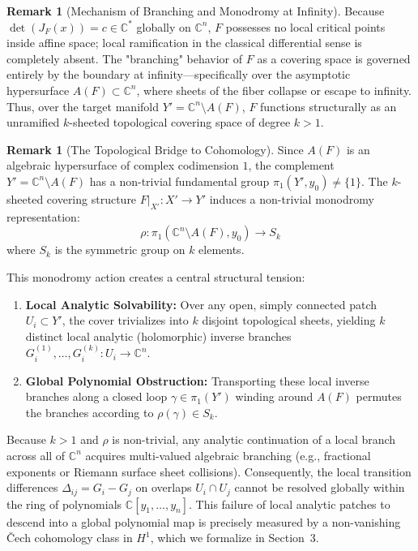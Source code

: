 \documentclass[11pt,reqno]{amsart}
\theoremstyle{definition}
\newtheorem{remark}[theorem]{Remark}
\begin{document}
\begin{remark}[Mechanism of Branching and Monodromy at Infinity]
Because $\det(J_F(x)) = c \in \mathbb{C}^*$ globally on $\mathbb{C}^n$, $F$ possesses no local critical points inside affine space; local ramification in the classical differential sense is completely absent. The "branching" behavior of $F$ as a covering space is governed entirely by the boundary at infinity—specifically over the asymptotic hypersurface $A(F) \subset \mathbb{C}^n$, where sheets of the fiber collapse or escape to infinity. Thus, over the target manifold $Y' = \mathbb{C}^n \setminus A(F)$, $F$ functions structurally as an unramified $k$-sheeted topological covering space of degree $k > 1$.
\end{remark}

\begin{remark}[The Topological Bridge to Cohomology]
Since $A(F)$ is an algebraic hypersurface of complex codimension $1$, the complement $Y' = \mathbb{C}^n \setminus A(F)$ has a non-trivial fundamental group $\pi_1(Y', y_0) \neq \{1\}$. The $k$-sheeted covering structure $F\big|_{X'}: X' \to Y'$ induces a non-trivial monodromy representation:
$$\rho: \pi_1(\mathbb{C}^n \setminus A(F), y_0) \longrightarrow S_k$$
where $S_k$ is the symmetric group on $k$ elements. 

This monodromy action creates a central structural tension:
\begin{enumerate}
    \item \textbf{Local Analytic Solvability:} Over any open, simply connected patch $U_i \subset Y'$, the cover trivializes into $k$ disjoint topological sheets, yielding $k$ distinct local analytic (holomorphic) inverse branches $G_i^{(1)}, \dots, G_i^{(k)}: U_i \to \mathbb{C}^n$.
    \item \textbf{Global Polynomial Obstruction:} Transporting these local inverse branches along a closed loop $\gamma \in \pi_1(Y')$ winding around $A(F)$ permutes the branches according to $\rho(\gamma) \in S_k$. 
\end{enumerate}
Because $k > 1$ and $\rho$ is non-trivial, any analytic continuation of a local branch across all of $\mathbb{C}^n$ acquires multi-valued algebraic branching (e.g., fractional exponents or Riemann surface sheet collisions). Consequently, the local transition differences $\Delta_{ij} = G_i - G_j$ on overlaps $U_i \cap U_j$ cannot be resolved globally within the ring of polynomials $\mathbb{C}[y_1, \dots, y_n]$. This failure of local analytic patches to descend into a global polynomial map is precisely measured by a non-vanishing \v{C}ech cohomology class in $H^1$, which we formalize in Section~3.
\end{remark}
\end{document}
